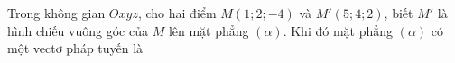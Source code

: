 \begin{ex}
Trong không gian $Oxyz$, cho hai điểm $M(1;2;-4)$ và $M'(5;4;2)$, biết $M'$ là hình chiếu vuông góc của $M$ lên mặt phẳng $(\alpha)$. Khi đó mặt phẳng $(\alpha)$ có một vectơ pháp tuyến là
\end{ex}
